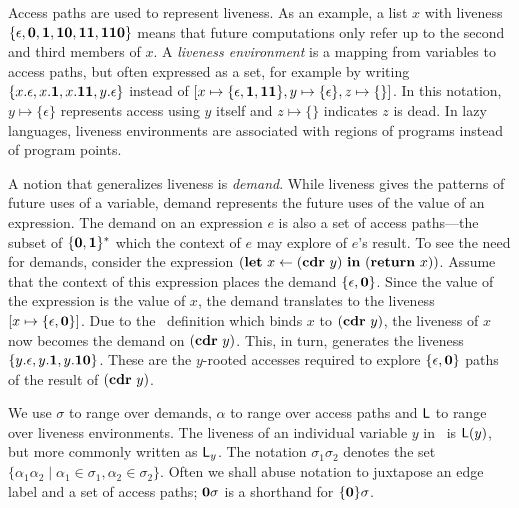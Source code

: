 \documentclass[9pt,preprint,nonatbib]{sigplanconf}
\begin{document}
Access paths are used to  represent liveness. As an example, a list
$x$ with 
liveness  $\{\epsilon,  \mathbf{0},  \mathbf{1},  \mathbf{1}\mathbf{0},
\mathbf{1}\mathbf{1},  \mathbf{1}\mathbf{1}\mathbf{0}\}$ means that future computations    only
refer up  to the  second and  third members of  $x$.  A  {\em liveness
  environment} is a mapping from  variables to access paths, but often
expressed as  a set,  for example  by writing  $\{x.\epsilon, x.\mathbf{1},
x.\mathbf{1}\mathbf{1},        y.\epsilon\}$        instead        of        $[x
  \mapsto\{\epsilon,\mathbf{1},\mathbf{1}\mathbf{1}\},          y\mapsto\{\epsilon\},
  z\mapsto\{\}]$.    In  this   notation,  $y   \mapsto  \{\epsilon\}$
represents access using $y$ itself and $z \mapsto \{\}$ indicates 
$z$ is dead.  In lazy  languages, liveness environments are associated
with regions of programs instead of program points.

A notion  that generalizes liveness  is {\em demand}.   While liveness
gives the patterns of future uses of a variable, demand represents the
future uses of the value of an expression.  The demand on an expression
$e$   is   also   a   set    of   access   paths---the   subset   of
$\{\mathbf{0},\mathbf{1}\}^\ast$ which the  context of $e$ may  explore of $e$'s
result.   To see  the need  for demands,  consider the expression
$(\mbox{$\mathbf{ let}$}~x\leftarrow  (\mbox{$\mathbf{cdr}$}~y)~\mbox{$\mathbf{ in}$}~   (\mbox{$\mathbf{ return}$}~x))$.   Assume   that  the
context of this expression places  the demand $\lbrace \epsilon, \mathbf{0}
\rbrace$. Since the  value of the expression is the  value of $x$, the
demand translates to the liveness  $[x \mapsto \lbrace \epsilon, \mathbf{0}
  \rbrace]$.   Due  to  the  \LET\   definition  which  binds  $x$  to
$(\mbox{$\mathbf{cdr}$}~y)$, the liveness of $x$  now becomes the demand on $(\mbox{$\mathbf{cdr}$}~y)$.
This, in  turn, generates  the liveness $\lbrace  y.\epsilon, y.\mathbf{1},
y.\mathbf{1}\mathbf{0}  \rbrace$.   These are  the $y$-rooted  accesses
required to  explore $\lbrace  \epsilon, \mathbf{0}  \rbrace$ paths  of the
result of $(\mbox{$\mathbf{cdr}$}~y)$.
  
We use $\sigma$  to range over demands, $\alpha$ to  range over access
paths and $\mathsf{L}$  to range over liveness environments.  The liveness of
an  individual variable  $y$ in  \Lv\  is $\mathsf{L}(y)$,  but more  commonly
written as  $\mathsf{L}_y$.  The notation $\sigma_1\sigma_2$  denotes the set
$\lbrace  \alpha_1\alpha_2 \mid  \alpha_1 \in  \sigma_1, \alpha_2  \in
\sigma_2\rbrace$.  Often we shall abuse  notation to juxtapose an edge
label and  a set  of access  paths; $\mathbf{0}\sigma$  is a  shorthand for
$\lbrace\mathbf{0}\rbrace\sigma$.
\end{document}
